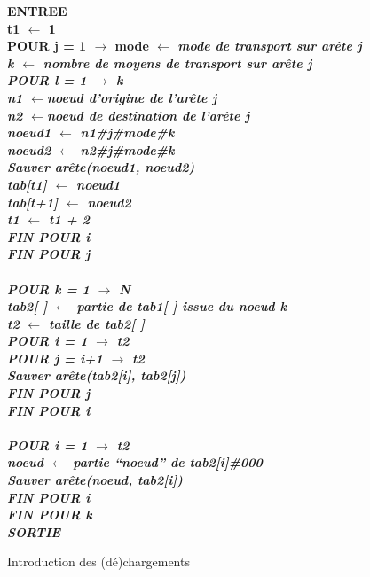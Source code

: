 \begin{center}
\begin{figure}[htbp]
{\begin{minipage}{20cm}
\begin{tabbing}
\bf {ENTREE}\\
t1 $\leftarrow$ 1\\
\bf {POUR } j = 1 $\rightarrow$ mode $\leftarrow$ \it{mode de transport sur arête j}\\
\> k $\leftarrow$ \it {nombre de moyens de transport sur arête j}\\
\> \bf {POUR} l = 1 $\rightarrow$ k\\
\> \>  n1 $\leftarrow$\it {noeud d'origine de l'arête j}\\
\> \> n2 $\leftarrow$\it {noeud de destination de l'arête j}\\
\> \> noeud1 $\leftarrow$ n1\#j\#mode\#k\\
\> \>  noeud2 $\leftarrow$ n2\#j\#mode\#k\\
\> \>  \it { Sauver arête(noeud1, noeud2)}\\
\> \> tab[t1] $\leftarrow$ noeud1\\
\> \>  tab[t+1] $\leftarrow$ noeud2\\
\> \> t1 $\leftarrow$ t1 + 2\\
\>  \bf {FIN POUR} i\\
\bf {FIN POUR} j\\
\\
\bf {POUR} k = 1 $\rightarrow$ N\\
\> tab2[ ] $\leftarrow$ \it{partie de tab1[ ] issue du noeud k}\\
\> t2 $\leftarrow$ \it {taille de tab2[ ]}\\
\> \bf{POUR}  i = 1 $\rightarrow$ t2\\
\> \> \bf{POUR} j = i+1 $\rightarrow$ t2\\
\> \> \> \it{Sauver arête(tab2[i], tab2[j])}\\
\> \> \bf{FIN POUR} j\\
\> \bf {FIN POUR} i\\
\\
\> \bf{POUR} i = 1 $\rightarrow$ t2\\
\> \> noeud $\leftarrow$ \it{partie ``noeud'' de tab2[i]\#000}\\
\> \> \it{Sauver arête(noeud, tab2[i])}\\
\> \bf{FIN POUR} i\\
\bf {FIN POUR} k\\
\bf {SORTIE}\\
\end{tabbing}
\end{minipage}
}
\caption{\label{algo2} Introduction des (d\'e)chargements}
\end{figure}
\end{center}


